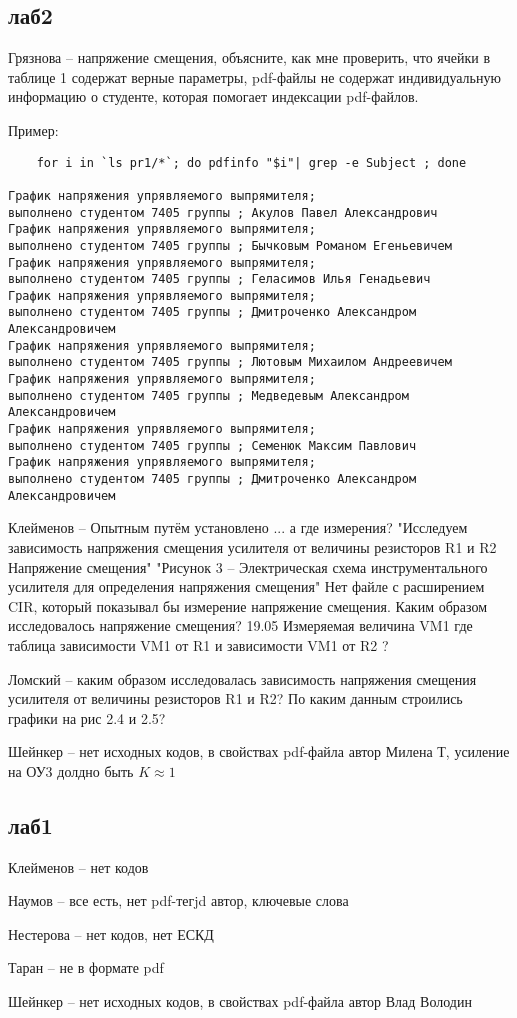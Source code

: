 \documentclass[a4paper,11pt]{article}
\begin{document}
\newpage
\subsection*{лаб2}
Грязнова -- напряжение смещения, объясните, как мне проверить, что ячейки в таблице 1 содержат верные параметры,
            pdf-файлы не содержат индивидуальную информацию о студенте, которая помогает индексации pdf-файлов.

Пример:
\begin{verbatim}
    for i in `ls pr1/*`; do pdfinfo "$i"| grep -e Subject ; done

График напряжения упрявляемого выпрямителя; 
выполнено студентом 7405 группы ; Акулов Павел Александрович
График напряжения упрявляемого выпрямителя; 
выполнено студентом 7405 группы ; Бычковым Романом Егеньевичем
График напряжения упрявляемого выпрямителя; 
выполнено студентом 7405 группы ; Геласимов Илья Генадьевич
График напряжения упрявляемого выпрямителя; 
выполнено студентом 7405 группы ; Дмитроченко Александром Александровичем
График напряжения упрявляемого выпрямителя; 
выполнено студентом 7405 группы ; Лютовым Михаилом Андреевичем
График напряжения упрявляемого выпрямителя; 
выполнено студентом 7405 группы ; Медведевым Александром Александровичем
График напряжения упрявляемого выпрямителя; 
выполнено студентом 7405 группы ; Семенюк Максим Павлович
График напряжения упрявляемого выпрямителя; 
выполнено студентом 7405 группы ; Дмитроченко Александром Александровичем
\end{verbatim}



Клейменов -- Опытным путём установлено ... а где измерения? 
 "Исследуем зависимость напряжения смещения усилителя от величины резисторов R1 и R2 Напряжение смещения"
"Рисунок 3 – Электрическая схема инструментального усилителя для определения напряжения смещения"
Нет файле с расширением CIR, который показывал бы измерение напряжение смещения.
Каким образом исследовалось напряжение смещения?
19.05 Измеряемая величина VM1 где таблица зависимости VM1 от R1 и зависимости VM1 от R2 ?


Ломский -- каким образом исследовалась зависимость напряжения смещения усилителя от величины резисторов R1 и R2?
 По каким данным  строились графики на рис 2.4 и 2.5?

Шейнкер -- нет исходных кодов, в свойствах pdf-файла автор Милена Т, усиление на ОУ3 долдно быть $K \approx 1$

\newpage
\subsection*{лаб1}
Клейменов -- нет кодов

Наумов -- все есть, нет pdf-тегjd автор, ключевые слова

Нестерова -- нет кодов, нет ЕСКД

Таран -- не в формате pdf

Шейнкер -- нет исходных кодов, в свойствах pdf-файла автор Влад Володин 
\end{document}
